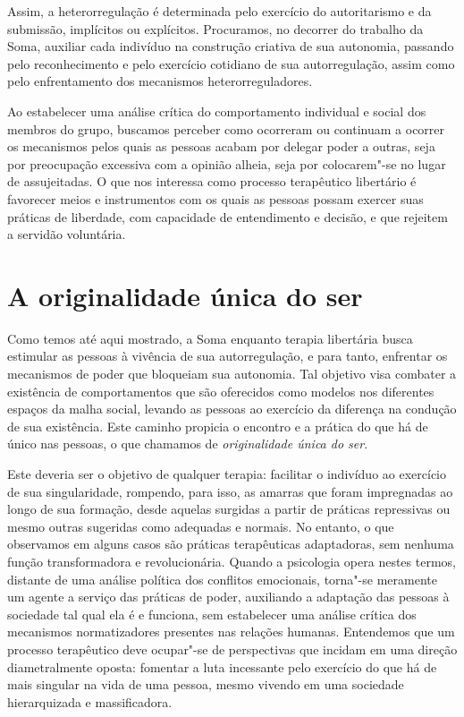Assim, a heterorregulação é determinada pelo exercício do autoritarismo
e da submissão, implícitos ou explícitos. Procuramos, no decorrer do
trabalho da Soma, auxiliar cada indivíduo na construção criativa de sua
autonomia, passando pelo reconhecimento e pelo exercício cotidiano de
sua autorregulação, assim como pelo enfrentamento dos mecanismos
heterorreguladores.

Ao estabelecer uma análise crítica do comportamento individual e social
dos membros do grupo, buscamos perceber como ocorreram ou continuam a
ocorrer os mecanismos pelos quais as pessoas acabam por delegar poder a
outras, seja por preocupação excessiva com a opinião alheia, seja por
colocarem"-se no lugar de assujeitadas. O que nos interessa como processo
terapêutico libertário é favorecer meios e instrumentos com os quais as
pessoas possam exercer suas práticas de liberdade, com capacidade de
entendimento e decisão, e que rejeitem a servidão voluntária.

\section{A originalidade única do ser}

Como temos até aqui mostrado, a Soma enquanto terapia libertária busca
estimular as pessoas à vivência de sua autorregulação, e para tanto,
enfrentar os mecanismos de poder que bloqueiam sua autonomia. Tal
objetivo visa combater a existência de comportamentos que são oferecidos
como modelos nos diferentes espaços da malha social, levando as pessoas
ao exercício da diferença na condução de sua existência. Este caminho
propicia o encontro e a prática do que há de único nas pessoas, o que
chamamos de \emph{originalidade única do ser}.

Este deveria ser o objetivo de qualquer terapia: facilitar o indivíduo
ao exercício de sua singularidade, rompendo, para isso, as amarras que
foram impregnadas ao longo de sua formação, desde aquelas surgidas a
partir de práticas repressivas ou mesmo outras sugeridas como adequadas
e normais. No entanto, o que observamos em alguns casos são práticas
terapêuticas adaptadoras, sem nenhuma função transformadora e
revolucionária. Quando a psicologia opera nestes termos, distante de
uma análise política dos conflitos emocionais, torna"-se meramente um
agente a serviço das práticas de poder, auxiliando a adaptação das
pessoas à sociedade tal qual ela é e funciona, sem estabelecer uma
análise crítica dos mecanismos normatizadores presentes nas relações
humanas. Entendemos que um processo terapêutico deve ocupar"-se de
perspectivas que incidam em uma direção diametralmente oposta: fomentar
a luta incessante pelo exercício do que há de mais singular na vida de
uma pessoa, mesmo vivendo em uma sociedade hierarquizada e
massificadora.

